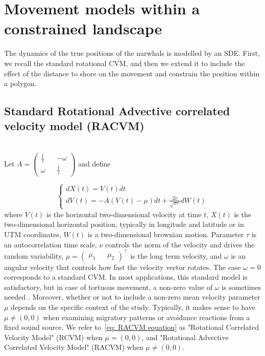 \documentclass[aoas]{imsart}
\theoremstyle{definition}
\theoremstyle{remark}
\theoremstyle{remark}
\newcommand {\1}{\mathbb{1}}
\begin{document}
\section{Movement models within a constrained landscape}

The dynamics of the true positions of the narwhals is modelled by an SDE. First, we recall the standard rotational CVM, and then we extend it to include the effect of the distance to shore on the movement and constrain the position within a polygon.


\subsection{Standard Rotational Advective correlated velocity model (RACVM)}
\label{section: RACVM}
\mbox{}\\

Let $A=\begin{pmatrix} 
	\frac{1}{\tau} &&-\omega \\
	\omega && \frac{1}{\tau}
\end{pmatrix}$ and define

\begin{equation} \left\{
	\begin{array}{l}
		dX(t)=V(t)dt \\
		dV(t)=-A(V(t)-\mu)dt+\frac{2\nu}{\sqrt{\pi \tau}} dW(t) 
	\end{array}
	\right.
	\label{eq: RACVM equation}
\end{equation}
where $V(t)$ is the horizontal two-dimensional velocity at time $t$, $X(t)$ is the two-dimensional horizontal position, typically in longitude and latitude or in UTM coordinates, $W(t)$ is a two-dimensional brownian motion. Parameter $\tau$ is an autocorrelation time scale, $\nu$ controls the norm of the velocity and drives the random variability, $\mu=\begin{pmatrix} \mu_1 && \mu_2 \end{pmatrix}^\top$ is the long term velocity, and $\omega$ is an angular velocity that controls how fast the velocity vector rotates. The case $\omega=0$ corresponds to a standard CVM. In most applications, this standard model is satisfactory, but in case of tortuous movement, a non-zero value of $\omega$ is sometimes needed \citep{gurarie_correlated_2017,alt_correlation_1990,albertsen_generalizing_2018}. Moreover, whether or not to include a non-zero mean velocity parameter $\mu$ depends on the specific context of the study. Typically, it makes sense to have $\mu\neq (0,0)$ when examining migratory patterns or avoidance reactions from a fixed sound source. 
We refer to~\eqref{eq: RACVM equation} as "Rotational Correlated Velocity Model" (RCVM) when $\mu=(0,0)$, and "Rotational Advective Correlated Velocity Model" (RACVM) when $\mu \neq (0,0)$.\\
\end{document}

